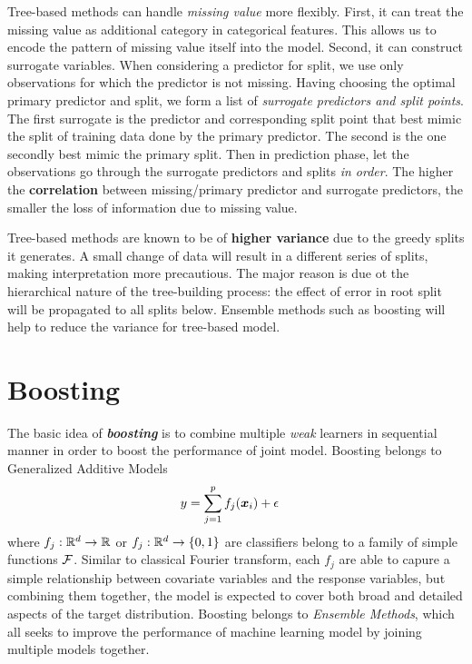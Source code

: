 \documentclass[11pt]{article}
\begin{document}
Tree-based methods can handle \emph{missing value} more flexibly. First, it can treat the missing value as additional category in categorical features. This allows us to encode the pattern of missing value itself into the model. Second, it can construct surrogate variables. When considering a predictor for split, we use only observations for which the predictor is not missing. Having choosing the optimal primary predictor and split, we form a list of \emph{surrogate predictors and split points}. The first surrogate is the predictor and corresponding split point that best mimic the split of training data done by the primary predictor. The second is the one secondly best mimic the primary split. Then in prediction phase, let the observations go through the surrogate predictors and splits \emph{in order}. The higher the \textbf{correlation} between missing/primary predictor and surrogate predictors, the smaller the loss of information due to missing value. 

Tree-based methods are known to be of \textbf{higher variance} due to the greedy splits it generates. A small change of data will result in a  different series of splits, making interpretation more precautious. The major reason is due ot the hierarchical nature of the tree-building process: the effect of error in root split will be propagated to all splits below.  Ensemble methods such as boosting will help to reduce the variance for tree-based model. 

\section{Boosting}
The basic idea of \emph{\textbf{boosting}} is to combine multiple \textit{weak} learners in sequential manner in order to boost the performance of joint model. Boosting belongs to Generalized Additive Models
\begin{align*}
y &= \sum_{j=1}^{p}f_j(\boldsymbol{x}_{i}) + \epsilon
\end{align*} where $f_{j}: {\mathbb R}^{d} \rightarrow {\mathbb R}$ or $f_{j}: {\mathbb R}^{d} \rightarrow \left\{0, 1\right\}$ are classifiers belong to a family of simple functions ${\mathcal F}$. Similar to classical Fourier transform, each $f_{j}$ are able to capure a simple relationship between covariate variables and the response variables, but combining them together, the model is expected to cover both broad and detailed aspects of the target distribution. Boosting belongs to \textit{Ensemble Methods}, which all seeks to improve the performance of machine learning model by joining multiple models together. 
\end{document}
